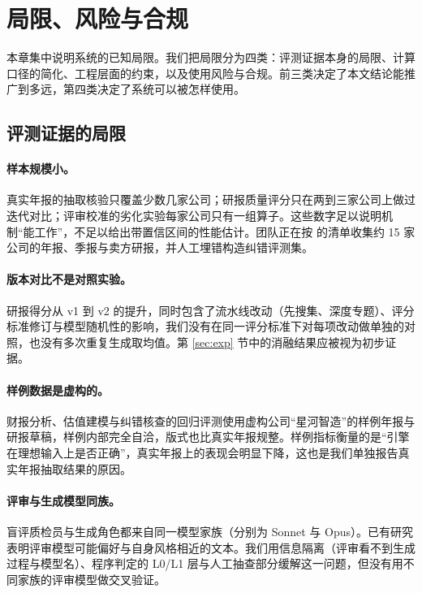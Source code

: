 \section{局限、风险与合规}
\label{sec:limits}

本章集中说明系统的已知局限。我们把局限分为四类：评测证据本身的局限、计算口径的简化、工程层面的约束，以及使用风险与合规。前三类决定了本文结论能推广到多远，第四类决定了系统可以被怎样使用。

\subsection{评测证据的局限}

\paragraph{样本规模小。}真实年报的抽取核验只覆盖少数几家公司；研报质量评分只在两到三家公司上做过迭代对比；评审校准的劣化实验每家公司只有一组算子。这些数字足以说明机制“能工作”，不足以给出带置信区间的性能估计。团队正在按  的清单收集约 15 家公司的年报、季报与卖方研报，并人工埋错构造纠错评测集。

\paragraph{版本对比不是对照实验。}研报得分从 v1 到 v2 的提升，同时包含了流水线改动（先搜集、深度专题）、评分标准修订与模型随机性的影响，我们没有在同一评分标准下对每项改动做单独的对照，也没有多次重复生成取均值。第 \ref{sec:exp} 节中的消融结果应被视为初步证据。

\paragraph{样例数据是虚构的。}财报分析、估值建模与纠错核查的回归评测使用虚构公司“星河智造”的样例年报与研报草稿，样例内部完全自洽，版式也比真实年报规整。样例指标衡量的是“引擎在理想输入上是否正确”，真实年报上的表现会明显下降，这也是我们单独报告真实年报抽取结果的原因。

\paragraph{评审与生成模型同族。}盲评质检员与生成角色都来自同一模型家族（分别为 Sonnet 与 Opus）。已有研究表明评审模型可能偏好与自身风格相近的文本\cite{panickssery2024self}。我们用信息隔离（评审看不到生成过程与模型名）、程序判定的 L0/L1 层与人工抽查部分缓解这一问题，但没有用不同家族的评审模型做交叉验证。

